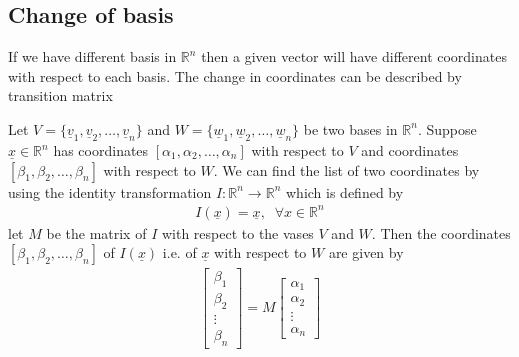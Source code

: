\documentclass[a4paper]{article}
\theoremstyle{plain}
\theoremstyle{definition}
\newtheorem{defn}{Definition}[section]
\theoremstyle{remark}
\begin{document}
\subsection{Change of basis}
If we have different basis in  $\mathbb{R}^{n}$ then a given vector will have different coordinates with respect to each basis. The change in coordinates can be described by transition matrix
\begin{tcolorbox}[colback=black!3!white,colframe=black!60!white,title=\begin{defn}Transition Matrix \label{Transition Matrix}\end{defn}]
Let $V = \{\underline{v}_1, \underline{v}_2, \ldots, \underline{v}_n \}$ and $W = \{ \underline{w}_1, \underline{w}_2,\ldots,\underline{w}_n\}$ be two bases in $\mathbb{R}^{n}$. Suppose $\underline{x} \in \mathbb{R}^{n}$ has coordinates $[\alpha_1,\alpha_2,\ldots,\alpha_n]$ with respect to $V$ and coordinates $[\beta_1,\beta_2,\ldots,\beta_n]$ with respect to $W$. We can find the list of two coordinates by using the identity transformation $I : \mathbb{R}^{n}\to \mathbb{R}^{n}$ which is defined by
\begin{align}
I(\underline{x}) = \underline{x}, \; \; \forall x \in \mathbb{R}^{n}
\end{align}
let $M$ be the matrix of $I$ with respect to the vases $V$ and $W$. Then the coordinates $[\beta_1, \beta_2 , \ldots , \beta_n ]$ of $I(\underline{x})$ i.e. of $\underline{x}$ with respect to $W$ are given by
\begin{align}
	\begin{bmatrix} \beta_1\\ \beta_2 \\ \vdots \\ \beta_n \end{bmatrix} = M \begin{bmatrix} \alpha_1 \\ \alpha_2 \\ \vdots \\ \alpha_n \end{bmatrix} 
\end{align}
\end{tcolorbox}
\end{document}
